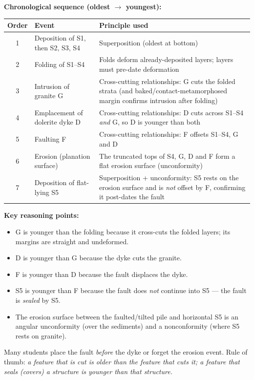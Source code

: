 \documentclass[11pt]{article}
\newcommand{\cle}[1]{{\popxbold\color{popdark}#1}}
\begin{document}
\begin{corrige}
\textbf{Chronological sequence (oldest $\rightarrow$ youngest):}

\begin{center}
\begin{tabularx}{\linewidth}{|c|X|X|}\hline
\rowcolor{popblueL}
\textbf{Order} & \textbf{Event} & \textbf{Principle used} \\ \hline
1 & Deposition of S1, then S2, S3, S4 & Superposition (oldest at bottom) \\ \hline
2 & Folding of S1--S4 & Folds deform already-deposited layers; layers must pre-date deformation \\ \hline
3 & Intrusion of granite G & Cross-cutting relationships: G cuts the folded strata (and baked/contact-metamorphosed margin confirms intrusion after folding) \\ \hline
4 & Emplacement of dolerite dyke D & Cross-cutting relationships: D cuts across S1--S4 \emph{and} G, so D is younger than both \\ \hline
5 & Faulting F & Cross-cutting relationships: F offsets S1--S4, G and D \\ \hline
6 & Erosion (planation surface) & The truncated tops of S4, G, D and F form a flat erosion surface (unconformity) \\ \hline
7 & Deposition of flat-lying S5 & Superposition + unconformity: S5 rests on the erosion surface and is \emph{not} offset by F, confirming it post-dates the fault \\ \hline
\end{tabularx}
\end{center}

\textbf{Key reasoning points:}
\begin{itemize}
\item G is younger than the folding because it cross-cuts the folded layers; its margins are straight and undeformed.
\item D is younger than G because the dyke cuts the granite.
\item F is younger than D because the fault displaces the dyke.
\item S5 is younger than F because the fault does \emph{not} continue into S5 — the fault is \emph{sealed} by S5.
\item The erosion surface between the faulted/tilted pile and horizontal S5 is an \cle{angular unconformity} (over the sediments) and a \cle{nonconformity} (where S5 rests on granite).
\end{itemize}

\begin{attention}
Many students place the fault \emph{before} the dyke or forget the erosion event. Rule of thumb: \emph{a feature that is cut is older than the feature that cuts it; a feature that seals (covers) a structure is younger than that structure.}
\end{attention}
\end{corrige}
\end{document}
